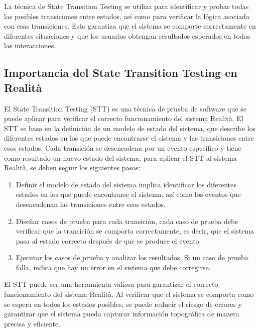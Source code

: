 \documentclass[12pt,a4paper, twoside]{article} %
\begin{document}
La técnica de State Transition Testing se utiliza para identificar y probar todas las posibles transiciones entre estados, así como para verificar la lógica asociada con esas transiciones. Esto garantiza que el sistema se comporte correctamente en diferentes situaciones y que los usuarios obtengan resultados esperados en todas las interacciones.

\subsection{Importancia del State Transition Testing en Realità}
\label{sec:orgdaca22c}

El State Transition Testing (STT) es una técnica de prueba de software que se puede aplicar para verificar el correcto funcionamiento del sistema Realità. El STT se basa en la definición de un modelo de estado del sistema, que describe los diferentes estados en los que puede encontrarse el sistema y las transiciones entre esos estados. Cada transición se desencadena por un evento específico y tiene como resultado un nuevo estado del sistema, para aplicar el STT al sistema Realità, se deben seguir los siguientes pasos:

\begin{enumerate}
\item Definir el modelo de estado del sistema implica identificar los diferentes estados en los que puede encontrarse el sistema, así como los eventos que desencadenan las transiciones entre esos estados.

\item Diseñar casos de prueba para cada transición, cada caso de prueba debe verificar que la transición se comporta correctamente, es decir, que el sistema pasa al estado correcto después de que se produce el evento.

\item Ejecutar los casos de prueba y analizar los resultados. Si un caso de prueba falla, indica que hay un error en el sistema que debe corregirse.


\end{enumerate}



El STT puede ser una herramienta valiosa para garantizar el correcto funcionamiento del sistema Realità. Al verificar que el sistema se comporta como se espera en todos los estados posibles, se puede reducir el riesgo de errores y garantizar que el sistema pueda capturar información topográfica de manera precisa y eficiente.
\newpage
\end{document}

